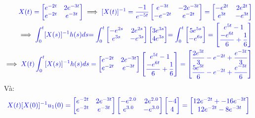 \documentclass[a4paper]{article}
\begin{document}
\begin{align*}
\notag
\textcolor{blue}{X(t)= \begin{bmatrix} e^{-2t} & 2e^{-3t}\\ e^{-2t} & e^{-3t} \end{bmatrix}} \implies \textcolor{blue}{[X(t)]^{-1}= \dfrac{-1}{e^{-5t}} \begin{bmatrix} e^{-3t} & -2e^{-3t}\\ -e^{-2t} & e^{-2t} \end{bmatrix}= \begin{bmatrix} 
 -e^{2t} & 2e^{2t}\\ e^{3t} & -e^{3t} \end{bmatrix} }\\
\implies  \textcolor{blue}
{\int_{0}^{t}[X(s)]^{-1}h(s) ds }\textcolor{blue}{=\int_{0}^{t}\begin{bmatrix} -e^{2s} & 2e^{2s}\\ e^{3s} & -e^{3s} \end{bmatrix} \begin{bmatrix} 3e^{3s} \\ 4e^{3s} \end{bmatrix}}
 \textcolor{blue}{= \int_{0}^{t}\begin{bmatrix} 5e^{5s} \\ -e^{6s} \end{bmatrix}= \begin{bmatrix} e^{5t}-1\\ \dfrac{-e^{6t}}{6}+\dfrac{1}{6}\end{bmatrix}} 
 \\ \implies \textcolor{blue}
{X(t)\int_{0}^{t}[X(s)]^{-1}h(s) ds =\begin{bmatrix} e^{-2t} & 2e^{-3t}\\ e^{-2t} & e^{-3t} \end{bmatrix}\begin{bmatrix} e^{5t}-1\\ \dfrac{-e^{6t}}{6}+\dfrac{1}{6}\end{bmatrix}=
\begin{bmatrix} \dfrac{2e^{3t}}{3}-e^{-2t}+\dfrac{e^{-3t}}{3}    \\ \dfrac{5e^{3t}}{6}-e^{-2t}+\dfrac{e^{-3t}}{6}   \end{bmatrix}}
 \end{align*}
 Và: 
 \begin{align}
 \textcolor{blue}{X(t)[X(0)]^{-1}u_1(0)=\begin{bmatrix} e^{-2t} & 2e^{-3t}\\ e^{-2t} & e^{-3t} \end{bmatrix}\begin{bmatrix} 
 -e^{2.0} & 2e^{2. 0}\\ e^{3.0} & -e^{3. 0} \end{bmatrix}\begin{bmatrix} -4 \\ 4 \end{bmatrix} = \begin{bmatrix} 12e^{-2t} + -16e^{-3t}\\ 12e^{-2t} - 8e^{-3t} \end{bmatrix}}
 \end{align}
\end{document}
